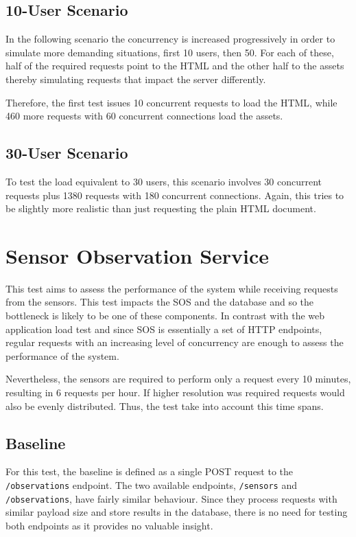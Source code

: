 \subsection*{10-User Scenario}

In the following scenario the concurrency is increased progressively in order to simulate more demanding situations, first 10 users, then 50. For each of these, half of the required requests point to the HTML and the other half to the assets thereby simulating requests that impact the server differently.

Therefore, the first test issues 10 concurrent requests to load the HTML, while 460 more requests with 60 concurrent connections load the assets.

\subsection*{30-User Scenario}

To test the load equivalent to 30 users, this scenario involves 30 concurrent requests plus 1380 requests with 180 concurrent connections. Again, this tries to be slightly more realistic than just requesting the plain HTML document.

\section{Sensor Observation Service}

This test aims to assess the performance of the system while receiving requests from the sensors. This test impacts the SOS and the database and so the bottleneck is likely to be one of these components. In contrast with the web application load test and since SOS is essentially a set of HTTP endpoints, regular requests with an increasing level of concurrency are enough to assess the performance of the system.

Nevertheless, the sensors are required to perform only a request every 10 minutes, resulting in 6 requests per hour. If higher resolution was required requests would also be evenly distributed. Thus, the test take into account this time spans.

\subsection*{Baseline}

For this test, the baseline is defined as a single POST request to the \texttt{/observations} endpoint. The two available endpoints, \texttt{/sensors} and \texttt{/observations}, have fairly similar behaviour. Since they process requests with similar payload size and store results in the database, there is no need for testing both endpoints as it provides no valuable insight.

